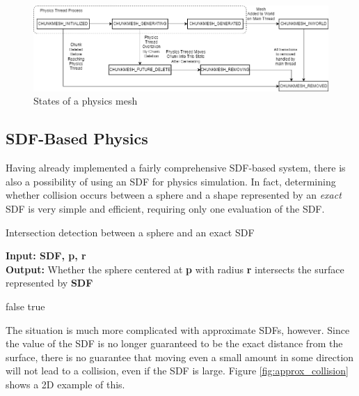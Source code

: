 \documentclass{article}
\begin{document}
 \begin{figure}[H]
  \includegraphics[width=\textwidth]{physics_states.png}
  \caption{States of a physics mesh}
  \label{fig:physics_states}
\end{figure}

\subsection{SDF-Based Physics}
Having already implemented a fairly comprehensive SDF-based system, there is also a possibility of using an SDF for physics simulation. In fact, determining whether collision occurs between a sphere and a shape represented by an \textit{exact} SDF is very simple and efficient, requiring only one evaluation of the SDF.

\begin{algorithm}[H]
  \caption{Intersection detection between a sphere and an exact SDF}\label{alg:sdf_sphere_collision}
  \hspace*{\algorithmicindent} \textbf{Input: SDF, p, r} \\
  \hspace*{\algorithmicindent} \textbf{Output:} Whether the sphere centered at \textbf{p} with radius \textbf{r} intersects the surface represented by \textbf{SDF} 
  \begin{algorithmic}
   \State\Return false
  \Else \State \Return true
  \EndIf
  \end{algorithmic}
\end{algorithm}

The situation is much more complicated with approximate SDFs, however. Since the value of the SDF is no longer guaranteed to be the exact distance from the surface, there is no guarantee that moving even a small amount in some direction will not lead to a collision, even if the SDF is large. Figure \ref{fig:approx_collision} shows a 2D example of this.
\end{document}
